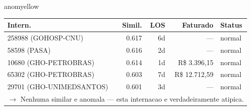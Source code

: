 \documentclass[a4paper,10pt]{article}
\begin{document}
\begin{anomalycard}[Internacao 183121 | PASA | MODERADO (z=2.92)]{anomyellow}
\begin{tabular}{l r r r l}\toprule\textbf{Intern.} & \textbf{Simil.} & \textbf{LOS} & \textbf{Faturado} & \textbf{Status} \\\midrule
258988 (GOHOSP-CNU) & 0.617 & 6d & --- & \textcolor{jcubeblue}{normal} \\
58598 (PASA) & 0.616 & 2d & --- & \textcolor{jcubeblue}{normal} \\
10680 (GHO-PETROBRAS) & 0.614 & 1d & R\$ 3.396,15 & \textcolor{jcubeblue}{normal} \\
65302 (GHO-PETROBRAS) & 0.603 & 7d & R\$ 12.712,59 & \textcolor{jcubeblue}{normal} \\
29701 (GHO-UNIMEDSANTOS) & 0.601 & 3d & --- & \textcolor{jcubeblue}{normal} \\
\multicolumn{5}{l}{\textcolor{jcubeblue}{\small $\rightarrow$ Nenhuma similar e anomala --- esta internacao e verdadeiramente atipica.}} \\
\bottomrule\end{tabular}



\end{anomalycard}

\newpage
\end{document}
